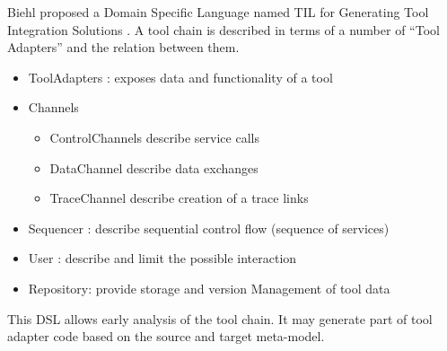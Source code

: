 \documentclass{openetcs_report}
\begin{document}
Biehl proposed a Domain Specific Language named TIL for Generating Tool Integration
Solutions \cite{biehl_matthias_domain_2011}.  A tool chain is described in terms
of a number of ``Tool Adapters'' and the relation between them.
\begin{itemize}
\item ToolAdapters : exposes data and functionality of a tool
\item Channels
  \begin{itemize}
  \item ControlChannels describe service calls
  \item DataChannel describe data exchanges
  \item TraceChannel  describe creation of a trace links
  \end{itemize}

\item Sequencer : describe sequential control flow (sequence of services)
\item User :  describe and limit the possible interaction
\item Repository:  provide storage and version Management of tool data
\end{itemize}
This DSL allows early analysis of the tool chain.
It may generate part of tool adapter code based on the source and target
meta-model.
\end{document}
